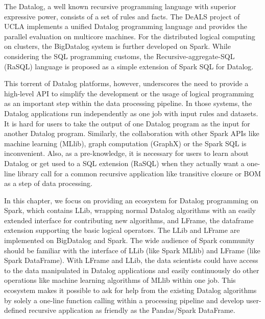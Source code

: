 The Datalog, a well known recursive programming language with superior expressive power, consists of a set of rules and facts. The DeALS project of UCLA \citep{yang2015parallel} implements a unified Datalog programming language and provides the parallel evaluation on multicore machines. For the distributed logical computing on clusters, the BigDatalog \citep{shkapsky2016big} system is further developed on Spark. While considering the SQL programming customs, the Recursive-aggregate-SQL (RaSQL) \citep{gu2019rasql} language is proposed as a simple extension of Spark SQL for Datalog.  


This torrent of Datalog platforms, however, underscores the need to provide a high-level API to simplify the development or the usage of logical programming as an important step within the data processing pipeline. In those systems, the Datalog applications run independently as one  job with input rules and datasets. It is hard for users to take the output of one Datalog program as the input for another Datalog program. Similarly, the collaboration with other Spark APIs like machine learning (MLlib), graph computation (GraphX) or the Spark SQL is inconvenient. Also, as a pre-knowledge, it is necessary for users to learn about Datalog or get used to a SQL extension (RaSQL) when they actually  want a one-line library call for a common recursive  application like transitive closure or BOM \citep{BOM} as a step of data processing. 


In this chapter, we focus on providing an ecosystem for Datalog programming on Spark, which contains LLib, wrapping normal Datalog algorithms with an easily extended interface for contributing new algorithms, and LFrame, the dataframe extension supporting the basic logical operators.  The LLib and LFrame are implemented on BigDatalog and Spark. The wide audience of Spark community should be familiar with the interface of LLib (like Spark MLlib) and LFrame (like Spark DataFrame). With LFrame and LLib, the data scientists could have access to the data manipulated in Datalog applications and easily continuously do other operations like machine learning algorithms of MLlib  within one job. This ecosystem makes it possible to ask for help from the existing Datalog algorithms by solely a one-line function calling within a processing pipeline and develop user-defined recursive application as friendly as the Pandas\citep{mckinney2010data}/Spark DataFrame. 

